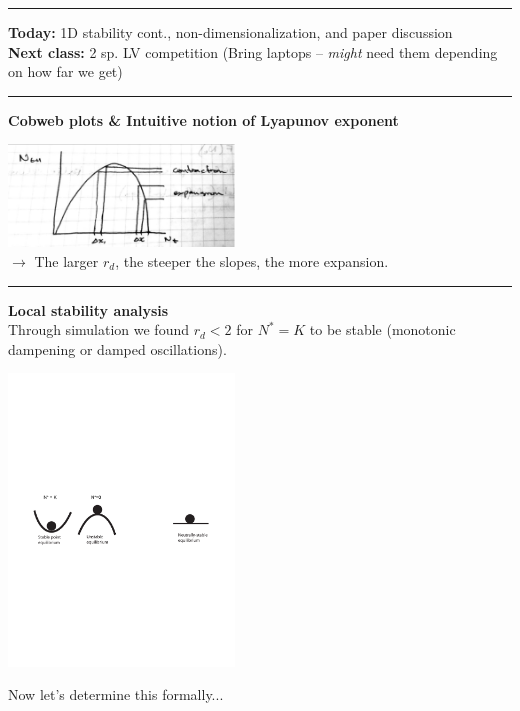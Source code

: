 \documentclass{article}
\begin{document}
\noindent{}
\rule[0.5ex]{\linewidth}{1pt}
\textbf{Today:} 1D stability cont., non-dimensionalization, and paper discussion\\
\textbf{Next class:} 2 sp. LV competition (Bring laptops -- \emph{might} need them depending on how far we get)\\
\rule[0.5ex]{\linewidth}{1pt}

\textbf{Cobweb plots \& Intuitive notion of Lyapunov exponent}
\begin{center}
\includegraphics[width=6cm]{figs/RickerLyapunov.pdf}\\
$\to$ The larger $r_d$, the steeper the slopes, the more expansion.
\end{center}

\rule[0.5ex]{\linewidth}{1pt}

\textbf{Local stability analysis}\\
Through simulation we found $r_d<2$ for $N^*=K$ to be stable 
(monotonic dampening or damped oscillations).
\begin{center}
\includegraphics[width=6cm]{figs/ballcup2.pdf}
\end{center}

Now let's determine this formally...
\end{document}

